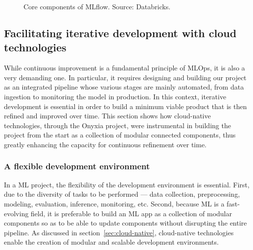 \documentclass[graybox]{svmult}
\begin{document}
\begin{figure}[htbp]
    \centering
    \caption{Core components of MLflow. Source: Databricks.}
    \label{fig:mlflow-components}
\end{figure}






\subsection{Facilitating iterative development with cloud technologies}

While continuous improvement is a fundamental principle of MLOps, it is also a very demanding one. In particular, it requires designing and building our project as an integrated pipeline whose various stages are mainly automated, from data ingestion to monitoring the model in production. In this context, iterative development is essential in order to build a minimum viable product that is then refined and improved over time. This section shows how cloud-native technologies, through the Onyxia project, were instrumental in building the project from the start as a collection of modular connected components, thus greatly enhancing the capacity for continuous refinement over time.

\subsubsection{A flexible development environment}

In a ML project, the flexibility of the development environment is essential. First, due to the diversity of tasks to be performed — data collection, preprocessing, modeling, evaluation, inference, monitoring, etc. Second, because ML is a fast-evolving field, it is preferable to build an ML app as a collection of modular components so as to be able to update components without disrupting the entire pipeline. As discussed in section~\ref{sec:cloud-native}, cloud-native technologies enable the creation of modular and scalable development environments.
\end{document}
